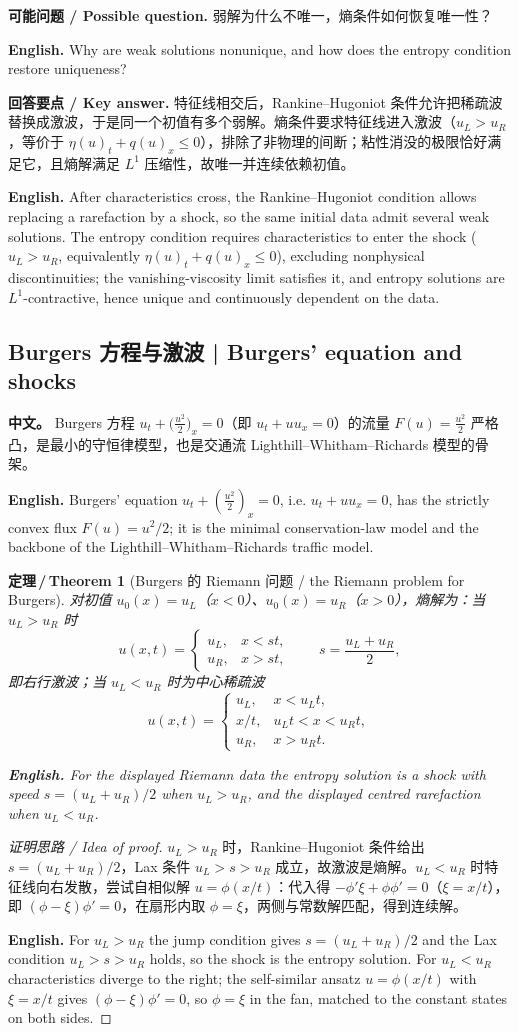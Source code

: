 \documentclass[UTF8,11pt,a4paper]{ctexart}
\newcommand{\APS}[2]{\par\noindent\textbf{中文。} #1\par\noindent\textbf{English.} #2\par\smallskip}
\newcommand{\EN}[1]{\par\noindent \textbf{English.} #1\par}
\newcommand{\ASK}[4]{\par\noindent \textbf{可能问题 / Possible question.} #1\par\EN{#2}\noindent \textbf{回答要点 / Key answer.} #3\par\EN{#4}\medskip}
\newtheorem{theorem}[definition]{定理\,/\,Theorem}
\begin{document}
\ASK{弱解为什么不唯一，熵条件如何恢复唯一性？}{Why are weak solutions nonunique, and how does the entropy condition restore uniqueness?}{特征线相交后，Rankine--Hugoniot 条件允许把稀疏波替换成激波，于是同一个初值有多个弱解。熵条件要求特征线进入激波（$u_L>u_R$，等价于 $\eta(u)_t+q(u)_x\le0$），排除了非物理的间断；粘性消没的极限恰好满足它，且熵解满足 $L^1$ 压缩性，故唯一并连续依赖初值。}{After characteristics cross, the Rankine--Hugoniot condition allows replacing a rarefaction by a shock, so the same initial data admit several weak solutions. The entropy condition requires characteristics to enter the shock ($u_L>u_R$, equivalently $\eta(u)_t+q(u)_x\le0$), excluding nonphysical discontinuities; the vanishing-viscosity limit satisfies it, and entropy solutions are $L^1$-contractive, hence unique and continuously dependent on the data.}

\subsection{Burgers 方程与激波 | Burgers' equation and shocks}
\APS{Burgers 方程 $u_t+\bigl(\frac{u^2}{2}\bigr)_x=0$（即 $u_t+uu_x=0$）的流量 $F(u)=\frac{u^2}{2}$ 严格凸，是最小的守恒律模型，也是交通流 Lighthill--Whitham--Richards 模型的骨架。}{Burgers' equation $u_t+(\tfrac{u^2}{2})_x=0$, i.e. $u_t+uu_x=0$, has the strictly convex flux $F(u)=u^2/2$; it is the minimal conservation-law model and the backbone of the Lighthill--Whitham--Richards traffic model.}

\begin{theorem}[Burgers 的 Riemann 问题 / the Riemann problem for Burgers]\label{thm:riemann}
对初值 $u_0(x)=u_L$（$x<0$）、$u_0(x)=u_R$（$x>0$），熵解为：当 $u_L>u_R$ 时
\[
u(x,t)=\begin{cases}u_L,&x<st,\\ u_R,&x>st,\end{cases}\qquad s=\frac{u_L+u_R}{2},
\]
即右行激波；当 $u_L<u_R$ 时为中心稀疏波
\[
u(x,t)=\begin{cases}u_L,&x<u_Lt,\\ x/t,&u_Lt<x<u_Rt,\\ u_R,&x>u_Rt .\end{cases}
\]
\EN{For the displayed Riemann data the entropy solution is a shock with speed $s=(u_L+u_R)/2$ when $u_L>u_R$, and the displayed centred rarefaction when $u_L<u_R$.}
\end{theorem}

\begin{proof}[证明思路 / Idea of proof]
$u_L>u_R$ 时，Rankine--Hugoniot 条件给出 $s=(u_L+u_R)/2$，Lax 条件 $u_L>s>u_R$ 成立，故激波是熵解。$u_L<u_R$ 时特征线向右发散，尝试自相似解 $u=\phi(x/t)$：代入得 $-\phi'\xi+\phi\phi'=0$（$\xi=x/t$），即 $(\phi-\xi)\phi'=0$，在扇形内取 $\phi=\xi$，两侧与常数解匹配，得到连续解。\EN{For $u_L>u_R$ the jump condition gives $s=(u_L+u_R)/2$ and the Lax condition $u_L>s>u_R$ holds, so the shock is the entropy solution. For $u_L<u_R$ characteristics diverge to the right; the self-similar ansatz $u=\phi(x/t)$ with $\xi=x/t$ gives $(\phi-\xi)\phi'=0$, so $\phi=\xi$ in the fan, matched to the constant states on both sides.}
\end{proof}
\end{document}
